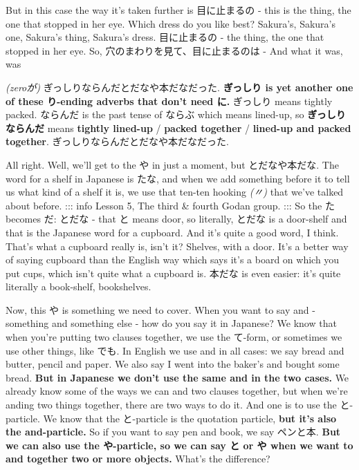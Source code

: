 \thinrule

But in this case the way it's taken further is 目に止まるの - this is the thing, the one that stopped in her eye. Which dress do you like best? Sakura's, Sakura's one, Sakura's thing, Sakura's dress. 目に止まるの - the thing, the one that stopped in her eye. So, 穴のまわりを見て、目に止まるのは -  And what it was, was

{}

{\em (zeroが)} ぎっしりならんだとだなや本だなだった. {\bf ぎっしり is yet another one of these り-ending adverbs that don't need に.} ぎっしり means tightly packed. ならんだ is the past tense of ならぶ which means lined-up, so {\bf ぎっしり ならんだ} means {\bf tightly lined-up} / {\bf packed together} / {\bf lined-up and packed together}. ぎっしりならんだとだなや本だなだった.

\thinrule

All right. Well, we'll get to the や in just a moment, but とだなや本だな. The word for a shelf in Japanese is たな, and when we add something before it to tell us what kind of a shelf it is, we use that ten-ten hooking {\em (〃)} that we've talked about before.\crlf
::: info Lesson 5, The third & fourth Godan group. ::: So the た becomes だ: とだな - that と means door, so literally, とだな is a door-shelf and that is the Japanese word for a cupboard. And it's quite a good word, I think. That's what a cupboard really is, isn't it? Shelves, with a door. It's a better way of saying cupboard than the English way which says it's a board on which you put cups, which isn't quite what a cupboard is. 本だな is even easier: it's quite literally a book-shelf, bookshelves.

\stopsectionlevel

\startsectionlevel[title={The や particle + exclusive and},reference={the-や-particle-exclusive-and}]

Now, this や is something we need to cover. When you want to say and - something and something else - how do you say it in Japanese? We know that when you're putting two clauses together, we use the て-form, or sometimes we use other things, like でも. In English we use and in all cases: we say bread and butter, pencil and paper. We also say I went into the baker's and bought some bread. {\bf But in Japanese we don't use the same and in the two cases.} We already know some of the ways we can and two clauses together, but when we're anding two things together, there are two ways to do it. And one is to use the と-particle. We know that the と-particle is the quotation particle, {\bf but it's also the and-particle.} So if you want to say pen and book, we say ペンと本. {\bf But we can also use the や-particle, so we can say と or や when we want to and together two or more objects.} What's the difference?

